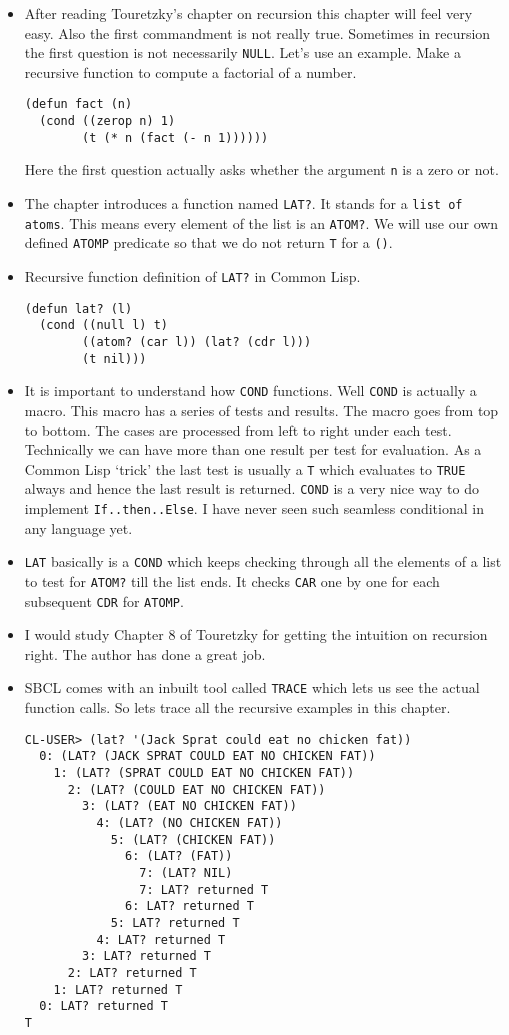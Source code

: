 \documentclass[11pt]{article}
\begin{document}
\vspace{1em}
\begin{itemize}
\item After reading Touretzky's chapter on recursion this chapter will feel very easy. Also the first commandment is not
really true. Sometimes in recursion the first question is not necessarily \texttt{NULL}. Let's use an example. Make a
recursive  function to compute a factorial of a number.
\begin{verbatim}
(defun fact (n)
  (cond ((zerop n) 1)
        (t (* n (fact (- n 1))))))
\end{verbatim}
Here the first question actually asks whether the argument \texttt{n} is a zero or not.
\item The chapter introduces a function named \texttt{LAT?}. It stands for a \texttt{list of atoms}. This means every element of the
list is an \texttt{ATOM?}. We will use our own defined \texttt{ATOMP} predicate so that we do not return \texttt{T} for a \texttt{()}.
\item Recursive function definition of \texttt{LAT?} in Common Lisp.
\begin{verbatim}
(defun lat? (l)
  (cond ((null l) t)
        ((atom? (car l)) (lat? (cdr l)))
        (t nil)))
\end{verbatim}
\item It is important to understand how \texttt{COND} functions. Well \texttt{COND} is actually a macro. This macro has a series of
tests and results. The macro goes from top to bottom. The cases are processed from left to right under each test.
Technically we can have more than one result per test for evaluation. As a Common Lisp `trick' the last test is
usually a \texttt{T} which evaluates to \texttt{TRUE} always and hence the last result is returned. \texttt{COND} is a very nice way to
do implement \texttt{If..then..Else}. I have never seen such seamless conditional in any language yet.
\item \texttt{LAT} basically is a \texttt{COND} which keeps checking through all the elements of a list to test for \texttt{ATOM?} till the
list ends. It checks \texttt{CAR} one by one for each subsequent \texttt{CDR} for \texttt{ATOMP}.
\item I would study Chapter 8 of Touretzky for getting the intuition on recursion right. The author has done a great job.
\item SBCL comes with an inbuilt tool called \texttt{TRACE} which lets us see the actual function calls. So lets trace all the
recursive examples in this chapter.
\begin{verbatim}
CL-USER> (lat? '(Jack Sprat could eat no chicken fat))
  0: (LAT? (JACK SPRAT COULD EAT NO CHICKEN FAT))
    1: (LAT? (SPRAT COULD EAT NO CHICKEN FAT))
      2: (LAT? (COULD EAT NO CHICKEN FAT))
        3: (LAT? (EAT NO CHICKEN FAT))
          4: (LAT? (NO CHICKEN FAT))
            5: (LAT? (CHICKEN FAT))
              6: (LAT? (FAT))
                7: (LAT? NIL)
                7: LAT? returned T
              6: LAT? returned T
            5: LAT? returned T
          4: LAT? returned T
        3: LAT? returned T
      2: LAT? returned T
    1: LAT? returned T
  0: LAT? returned T
T
\end{verbatim}


\end{itemize}
\end{document}
